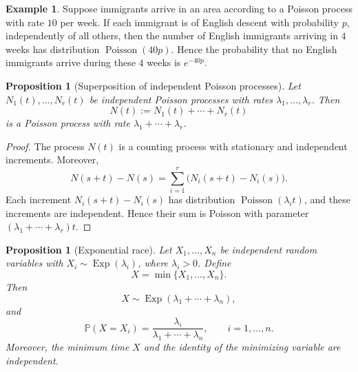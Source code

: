\documentclass[11pt]{article}
\theoremstyle{plain}
\newtheorem{proposition}[theorem]{Proposition}
\theoremstyle{definition}
\newtheorem{example}[theorem]{Example}
\theoremstyle{remark}
\begin{document}
	\begin{example}
		Suppose immigrants arrive in an area according to a Poisson process with rate \(10\) per week. If each immigrant is of English descent with probability \(p\), independently of all others, then the number of English immigrants arriving in \(4\) weeks has distribution \(\operatorname{Poisson}(40p)\). Hence the probability that no English immigrants arrive during these \(4\) weeks is \(e^{-40p}\).
	\end{example}
	
	\begin{proposition}[Superposition of independent Poisson processes]
		Let \(N_1(t),\dots,N_r(t)\) be independent Poisson processes with rates \(\lambda_1,\dots,\lambda_r\). Then
		\[
		N(t):=N_1(t)+\cdots+N_r(t)
		\]
		is a Poisson process with rate \(\lambda_1+\cdots+\lambda_r\).
	\end{proposition}
	
	\begin{proof}
		The process \(N(t)\) is a counting process with stationary and independent increments. Moreover,
		\[
		N(s+t)-N(s)
		=
		\sum_{i=1}^{r}\bigl(N_i(s+t)-N_i(s)\bigr).
		\]
		Each increment \(N_i(s+t)-N_i(s)\) has distribution \(\operatorname{Poisson}(\lambda_i t)\), and these increments are independent. Hence their sum is Poisson with parameter \((\lambda_1+\cdots+\lambda_r)t\).
	\end{proof}
	
\begin{proposition}[Exponential race]
	Let \(X_1,\dots,X_n\) be independent random variables with \(X_i\sim\operatorname{Exp}(\lambda_i)\), where \(\lambda_i>0\). Define
	\[
	X=\min\{X_1,\dots,X_n\}.
	\]
	Then
	\[
	X\sim\operatorname{Exp}(\lambda_1+\cdots+\lambda_n),
	\]
	and
	\[
	\mathbb{P}(X=X_i)=\frac{\lambda_i}{\lambda_1+\cdots+\lambda_n},
	\qquad i=1,\dots,n.
	\]
	Moreover, the minimum time \(X\) and the identity of the minimizing variable are independent.
\end{proposition}
\end{document}

